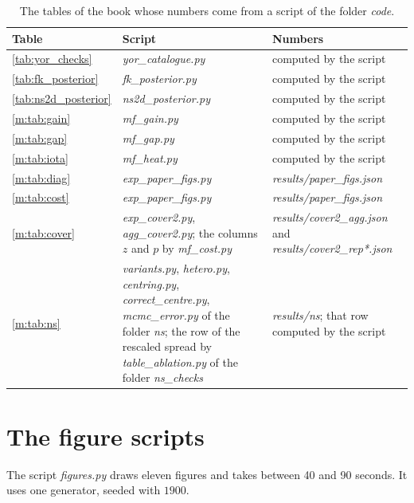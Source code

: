 \begin{table}[t]\centering\footnotesize\setlength{\tabcolsep}{4pt}
\caption{The tables of the book whose numbers come from a script of the folder \textit{code}.}\label{tab:code_tables}
\begin{tabular}{lp{2.2in}p{1.6in}}
\toprule
Table & Script & Numbers\\
\midrule
\ref{tab:yor_checks} & \textit{yor\_catalogue.py} & computed by the script\\
\ref{tab:fk_posterior} & \textit{fk\_posterior.py} & computed by the script\\
\ref{tab:ns2d_posterior} & \textit{ns2d\_posterior.py} & computed by the script\\
\ref{m:tab:gain} & \textit{mf\_gain.py} & computed by the script\\
\ref{m:tab:gap} & \textit{mf\_gap.py} & computed by the script\\
\ref{m:tab:iota} & \textit{mf\_heat.py} & computed by the script\\
\ref{m:tab:diag} & \textit{exp\_paper\_figs.py} & \textit{results/paper\_figs.json}\\
\ref{m:tab:cost} & \textit{exp\_paper\_figs.py} & \textit{results/paper\_figs.json}\\
\ref{m:tab:cover} & \textit{exp\_cover2.py}, \textit{agg\_cover2.py}; the columns $z$ and $p$ by \textit{mf\_cost.py} & \textit{results/cover2\_agg.json} and \textit{results/cover2\_rep*.json}\\
\ref{m:tab:ns} & \textit{variants.py}, \textit{hetero.py}, \textit{centring.py}, \textit{correct\_centre.py}, \textit{mcmc\_error.py} of the folder \textit{ns}; the row of the rescaled spread by \textit{table\_ablation.py} of the folder \textit{ns\_checks} & \textit{results/ns}; that row computed by the script\\
\bottomrule
\end{tabular}
\end{table}

\section{The figure scripts}
\label{sec:code_scripts}

The script \textit{figures.py} draws eleven figures and takes between 40 and 90 seconds. It uses one generator, seeded with $1900$.

